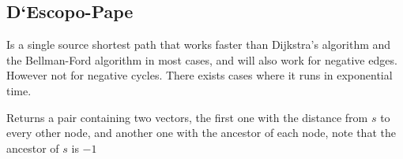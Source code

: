 \subsection {D`Escopo-Pape}

Is a single source shortest path that works faster than Dijkstra's algorithm and the Bellman-Ford algorithm in most cases, and will also work for negative edges. However not for negative cycles. There exists cases where it runs in exponential time.

Returns a pair containing two vectors, the first one with the distance from $s$ to every other node, and another one with the ancestor of each node, note that the ancestor of $s$ is $-1$
